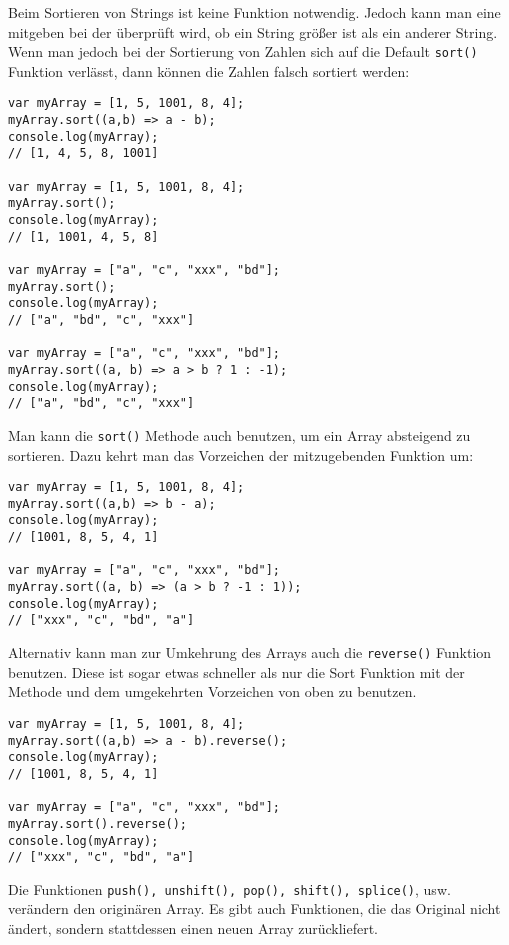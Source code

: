 \documentclass{book}
\begin{document}
Beim Sortieren von Strings ist keine Funktion notwendig. Jedoch kann man eine mitgeben bei der überprüft wird, ob ein String größer ist als ein anderer String. Wenn man jedoch bei der Sortierung von Zahlen sich auf die Default \lstinline|sort()| Funktion verlässt, dann können die Zahlen falsch sortiert werden:

\begin{lstlisting}[caption=Array Konstruktor]
var myArray = [1, 5, 1001, 8, 4];
myArray.sort((a,b) => a - b);
console.log(myArray);
// [1, 4, 5, 8, 1001]

var myArray = [1, 5, 1001, 8, 4];
myArray.sort();
console.log(myArray);
// [1, 1001, 4, 5, 8]

var myArray = ["a", "c", "xxx", "bd"];
myArray.sort();
console.log(myArray);
// ["a", "bd", "c", "xxx"]

var myArray = ["a", "c", "xxx", "bd"];
myArray.sort((a, b) => a > b ? 1 : -1);
console.log(myArray);
// ["a", "bd", "c", "xxx"]
\end{lstlisting}

Man kann die \lstinline|sort()| Methode auch benutzen, um ein Array absteigend zu sortieren. Dazu kehrt man das Vorzeichen der mitzugebenden Funktion um:

\begin{lstlisting}[caption=Array Konstruktor]
var myArray = [1, 5, 1001, 8, 4];
myArray.sort((a,b) => b - a);
console.log(myArray);
// [1001, 8, 5, 4, 1]

var myArray = ["a", "c", "xxx", "bd"];
myArray.sort((a, b) => (a > b ? -1 : 1));
console.log(myArray);
// ["xxx", "c", "bd", "a"]
\end{lstlisting}

Alternativ kann man zur Umkehrung des Arrays auch die \lstinline|reverse()| Funktion benutzen. Diese ist sogar etwas schneller als nur die Sort Funktion mit der Methode und dem umgekehrten Vorzeichen von oben zu benutzen.

\begin{lstlisting}[caption=Array Konstruktor]
var myArray = [1, 5, 1001, 8, 4];
myArray.sort((a,b) => a - b).reverse();
console.log(myArray);
// [1001, 8, 5, 4, 1]

var myArray = ["a", "c", "xxx", "bd"];
myArray.sort().reverse();
console.log(myArray);
// ["xxx", "c", "bd", "a"]
\end{lstlisting}

Die Funktionen \lstinline|push(), unshift(), pop(), shift(), splice()|, usw. verändern den originären Array. Es gibt auch Funktionen, die das Original nicht ändert, sondern stattdessen einen neuen Array zurückliefert.
\end{document}
